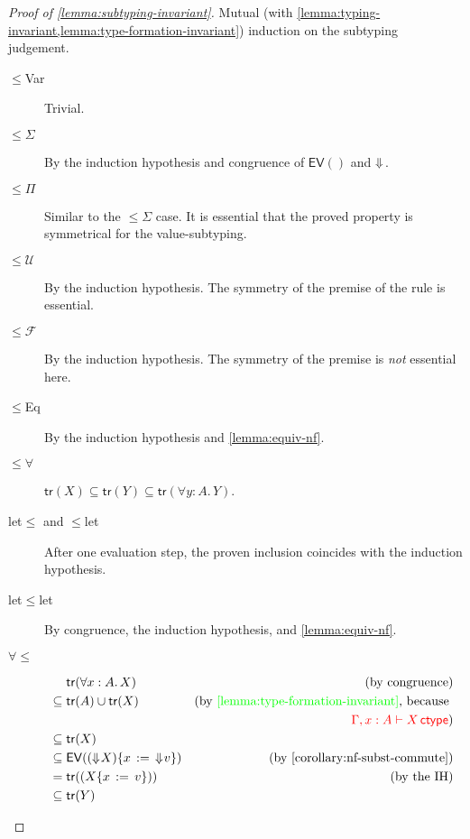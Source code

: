 \documentclass[a4,natbib=false]{article}
\newcommand{\ctov}{\mathcal{U}}
\newcommand{\vtoc}{\mathcal{F}}
\newcommand{\foralltype}[2]{\forall {#1}.\,#2}
\newcommand{\subst}[3]{{#1}\{{#2}\,:=\,{#3}\}}
\newcommand{\subt}{\leqslant}
\newcommand{\isctype}[1]{{#1} \, \mathsf{ctype}}
\newcommand{\nf}[1]{\Downarrow \hspace{-2pt} {#1}}
\newcommand{\judgectype}[2]{{#1} \vdash \isctype{#2}}
\newcommand{\evok}[1]{\mathsf{EV}^{\mathsf{OK}}(#1)}
\newcommand{\ev}[1]{\mathsf{EV}(#1)}
\newcommand{\trace}[1]{\mathsf{tr}({#1})}
\begin{document}
\begin{proof}[Proof of \cref{lemma:subtyping-invariant}]

  Mutual (with \cref{lemma:typing-invariant,lemma:type-formation-invariant}) induction on the subtyping judgement. 
  \begin{multicols}{2}
  \begin{description}
  \item[$\subt$Var] Trivial.
  \item[$\subt \Sigma$] By the induction hypothesis and congruence of $\ev{}$
    and $\nf{}$.
  \item[$\subt \Pi$] Similar to the $\subt \Sigma$ case. It is essential that
    the proved property is symmetrical for the value-subtyping.
  \item[$\subt \ctov$] By the induction hypothesis. The symmetry of the premise
    of the rule is essential.
  \item[$\subt \vtoc$] By the induction hypothesis. The symmetry of the premise
    is \emph{not} essential here.
  \item[$\subt$Eq] By the induction hypothesis and \cref{lemma:equiv-nf}.

  \item[$\subt \forall$] $\trace{{X}} \subseteq \trace{{Y}} \subseteq \trace{{\foralltype{y:A}{Y}}}$.
  \item[let$\subt$ and $\subt$let]
    After one evaluation step, the proven inclusion coincides with the induction hypothesis.
  \item[let$\subt$let] By congruence, the induction hypothesis, and \cref{lemma:equiv-nf}.
\item[$\forall \subt$]
  \begin{alignat*}{2}
                  & \trace{{\foralltype{x:A}{X}}}    &  \text{(by congruence)}\\
     \subseteq{ } & \trace{{A}} \cup \trace{{X}}     &  \text{(by {\color{green}\cref{lemma:type-formation-invariant}}, because }\\
                  &                                  &  {\color{red}\judgectype{\Gamma, x:A}{X}} \text{)}\\
     \subseteq{ } & \trace{{X}}                      &  \\
     \subseteq{ } & \ev{\subst{(\nf{X})}{x}{\nf{v}}} &  \text{(by \cref{corollary:nf-subst-commute})}\\
     ={ }         & \trace{{(\subst{X}{x}{v})}}      &  \text{(by the IH)}\\
     \subseteq{ } & \trace{{Y}}      &  \\
    \end{alignat*}



\end{description}
\end{multicols}
\end{proof}
\end{document}
